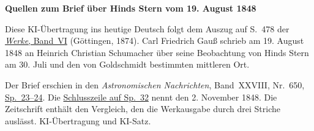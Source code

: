 \clearpage\thispagestyle{empty}
\begin{center}\textbf{Quellen zum Brief über Hinds Stern vom 19. August 1848}\end{center}
\noindent Diese KI-Übertragung ins heutige Deutsch folgt dem Auszug auf S.~478 der \href{https://gdz.sub.uni-goettingen.de/id/PPN236007467}{\textit{Werke}, Band~VI} (Göttingen, 1874). Carl Friedrich Gauß schrieb am 19. August 1848 an Heinrich Christian Schumacher über seine Beobachtung von Hinds Stern am 30. Juli und den von Goldschmidt bestimmten mittleren Ort.
\par\smallskip\noindent Der Brief erschien in den \textit{Astronomischen Nachrichten}, Band~XXVIII, Nr.~650, \href{https://api.digitale-sammlungen.de/iiif/image/v2/bsb10049453_00016/full/1800,/0/default.jpg}{Sp.~23--24}. Die \href{https://api.digitale-sammlungen.de/iiif/image/v2/bsb10049453_00020/full/1800,/0/default.jpg}{Schlusszeile auf Sp.~32} nennt den 2. November 1848. Die Zeitschrift enthält den Vergleich, den die Werkausgabe durch drei Striche auslässt. KI-Übertragung und KI-Satz.
\clearpage

